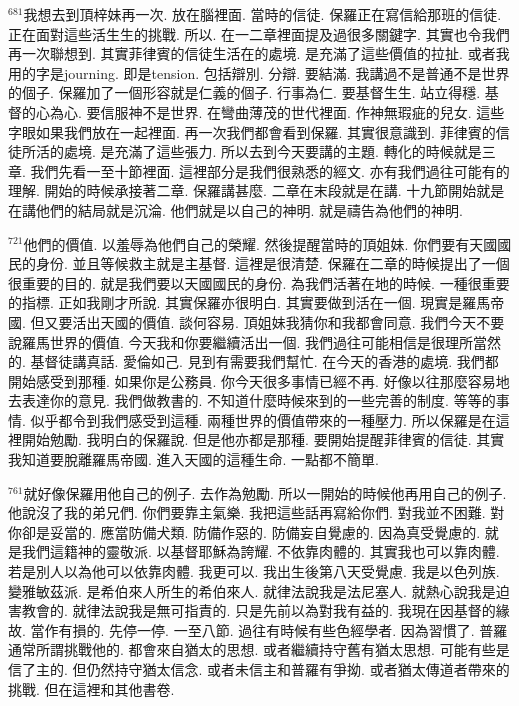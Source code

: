 \documentclass{book}
\begin{document}
$^{681}$我想去到頂梓妹再一次.
放在腦裡面.
當時的信徒.
保羅正在寫信給那班的信徒.
正在面對這些活生生的挑戰.
所以.
在一二章裡面提及過很多關鍵字.
其實也令我們再一次聯想到.
其實菲律賓的信徒生活在的處境.
是充滿了這些價值的拉扯.
或者我用的字是journing.
即是tension.
包括辯別.
分辯.
要結滿.
我講過不是普通不是世界的個子.
保羅加了一個形容就是仁義的個子.
行事為仁.
要基督生生.
站立得穩.
基督的心為心.
要信服神不是世界.
在彎曲薄茂的世代裡面.
作神無瑕疵的兒女.
這些字眼如果我們放在一起裡面.
再一次我們都會看到保羅.
其實很意識到.
菲律賓的信徒所活的處境.
是充滿了這些張力.
所以去到今天要講的主題.
轉化的時候就是三章.
我們先看一至十節裡面.
這裡部分是我們很熟悉的經文.
亦有我們過往可能有的理解.
開始的時候承接著二章.
保羅講甚麼.
二章在末段就是在講.
十九節開始就是在講他們的結局就是沉淪.
他們就是以自己的神明.
就是禱告為他們的神明.

$^{721}$他們的價值.
以羞辱為他們自己的榮耀.
然後提醒當時的頂姐妹.
你們要有天國國民的身份.
並且等候救主就是主基督.
這裡是很清楚.
保羅在二章的時候提出了一個很重要的目的.
就是我們要以天國國民的身份.
為我們活著在地的時候.
一種很重要的指標.
正如我剛才所說.
其實保羅亦很明白.
其實要做到活在一個.
現實是羅馬帝國.
但又要活出天國的價值.
談何容易.
頂姐妹我猜你和我都會同意.
我們今天不要說羅馬世界的價值.
今天我和你要繼續活出一個.
我們過往可能相信是很理所當然的.
基督徒講真話.
愛倫如己.
見到有需要我們幫忙.
在今天的香港的處境.
我們都開始感受到那種.
如果你是公務員.
你今天很多事情已經不再.
好像以往那麼容易地去表達你的意見.
我們做教書的.
不知道什麼時候來到的一些完善的制度.
等等的事情.
似乎都令到我們感受到這種.
兩種世界的價值帶來的一種壓力.
所以保羅是在這裡開始勉勵.
我明白的保羅說.
但是他亦都是那種.
要開始提醒菲律賓的信徒.
其實我知道要脫離羅馬帝國.
進入天國的這種生命.
一點都不簡單.

$^{761}$就好像保羅用他自己的例子.
去作為勉勵.
所以一開始的時候他再用自己的例子.
他說沒了我的弟兄們.
你們要靠主氣樂.
我把這些話再寫給你們.
對我並不困難.
對你卻是妥當的.
應當防備犬類.
防備作惡的.
防備妄自覺慮的.
因為真受覺慮的.
就是我們這籍神的靈敬派.
以基督耶穌為誇耀.
不依靠肉體的.
其實我也可以靠肉體.
若是別人以為他可以依靠肉體.
我更可以.
我出生後第八天受覺慮.
我是以色列族.
變雅敏茲派.
是希伯來人所生的希伯來人.
就律法說我是法尼塞人.
就熱心說我是迫害教會的.
就律法說我是無可指責的.
只是先前以為對我有益的.
我現在因基督的緣故.
當作有損的.
先停一停.
一至八節.
過往有時候有些色經學者.
因為習慣了.
普羅通常所謂挑戰他的.
都會來自猶太的思想.
或者繼續持守舊有猶太思想.
可能有些是信了主的.
但仍然持守猶太信念.
或者未信主和普羅有爭拗.
或者猶太傳道者帶來的挑戰.
但在這裡和其他書卷.
\end{document}
